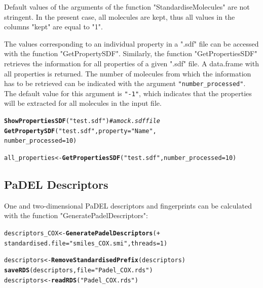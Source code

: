 \documentclass[twoside,a4wide,12pt]{article}\usepackage[]{graphicx}\usepackage[]{color}
\makeatletter
\newcommand{\hlnum}[1]{\textcolor[rgb]{0.686,0.059,0.569}{#1}}%
\newcommand{\hlstr}[1]{\textcolor[rgb]{0.192,0.494,0.8}{#1}}%
\newcommand{\hlcom}[1]{\textcolor[rgb]{0.678,0.584,0.686}{\textit{#1}}}%
\newcommand{\hlstd}[1]{\textcolor[rgb]{0.345,0.345,0.345}{#1}}%
\newcommand{\hlkwb}[1]{\textcolor[rgb]{0.69,0.353,0.396}{#1}}%
\newcommand{\hlkwc}[1]{\textcolor[rgb]{0.333,0.667,0.333}{#1}}%
\newcommand{\hlkwd}[1]{\textcolor[rgb]{0.737,0.353,0.396}{\textbf{#1}}}%
\newenvironment{kframe}{%
 \def\at@end@of@kframe{}%
 \ifinner\ifhmode%
  \def\at@end@of@kframe{\end{minipage}}%
  \begin{minipage}{\columnwidth}%
 \fi\fi%
 \def\FrameCommand##1{\hskip\@totalleftmargin \hskip-\fboxsep
 \colorbox{shadecolor}{##1}\hskip-\fboxsep
     \hskip-\linewidth \hskip-\@totalleftmargin \hskip\columnwidth}%
 \MakeFramed {\advance\hsize-\width
   \@totalleftmargin\z@ \linewidth\hsize
   \@setminipage}}%
 {\par\unskip\endMakeFramed%
 \at@end@of@kframe}
\newenvironment{knitrout}{}{} %
\makeatother
\begin{document}
Default values of the arguments of the function "StandardiseMolecules" are not stringent.
In the present case, all molecules are kept, thus all values in the columns "kept"
are equal to "1".

The values corresponding to an individual property in a ".sdf" file can be accessed with the function "GetPropertySDF".
Similarly, the function "GetPropertiesSDF" retrieves the information for all properties of a given ".sdf" file.
A data.frame with all properties is returned.
The number of molecules from which the information has to be retrieved can be indicated with the argument \verb|"number_processed"|.
The default value for this argument is \verb|"-1"|, which indicates that the properties will be extracted for all molecules in the input file.
\begin{knitrout}
\color{fgcolor}\begin{kframe}
\begin{alltt}
\hlkwd{ShowPropertiesSDF}\hlstd{(}\hlstr{"test.sdf"}\hlstd{)} \hlcom{# a mock .sdf file}
\hlkwd{GetPropertySDF}\hlstd{(}\hlstr{"test.sdf"}\hlstd{,}\hlkwc{property}\hlstd{=}\hlstr{"Name"}\hlstd{,}
               \hlkwc{number_processed}\hlstd{=}\hlnum{10}\hlstd{)}

\hlstd{all_properties} \hlkwb{<-} \hlkwd{GetPropertiesSDF}\hlstd{(}\hlstr{"test.sdf"}\hlstd{,}\hlkwc{number_processed}\hlstd{=}\hlnum{10}\hlstd{)}
\end{alltt}
\end{kframe}
\end{knitrout}


\subsection{PaDEL Descriptors}
One and two-dimensional PaDEL\cite{padel} descriptors and fingerprints can be calculated with the function "GeneratePadelDescriptors":
\begin{knitrout}
\color{fgcolor}\begin{kframe}
\begin{alltt}
descriptors_COX <- \hlkwd{GeneratePadelDescriptors}( +
  standardised.file=\hlstr{"smiles_COX.smi"},threads = 1)

descriptors <- \hlkwd{RemoveStandardisedPrefix}(descriptors)
\hlkwd{saveRDS}(descriptors, file=\hlstr{"Padel_COX.rds"})
descriptors <- \hlkwd{readRDS}(\hlstr{"Padel_COX.rds"})
\end{alltt}
\end{kframe}
\end{knitrout}
\end{document}
